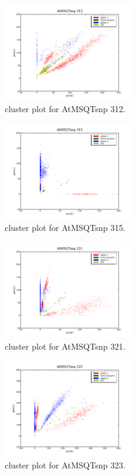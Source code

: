 \begin{figure}[H]
\includegraphics[width=0.5\textwidth]{figures/cluster_plot_AtMSQTsnp_312.png}
\caption{cluster plot for AtMSQTsnp 312.} \label{flAtMSQTsnp312}
\end{figure}
\begin{figure}[H]
\includegraphics[width=0.5\textwidth]{figures/cluster_plot_AtMSQTsnp_315.png}
\caption{cluster plot for AtMSQTsnp 315.} \label{flAtMSQTsnp315}
\end{figure}
\begin{figure}[H]
\includegraphics[width=0.5\textwidth]{figures/cluster_plot_AtMSQTsnp_321.png}
\caption{cluster plot for AtMSQTsnp 321.} \label{flAtMSQTsnp321}
\end{figure}
\begin{figure}[H]
\includegraphics[width=0.5\textwidth]{figures/cluster_plot_AtMSQTsnp_323.png}
\caption{cluster plot for AtMSQTsnp 323.} \label{flAtMSQTsnp323}
\end{figure}
